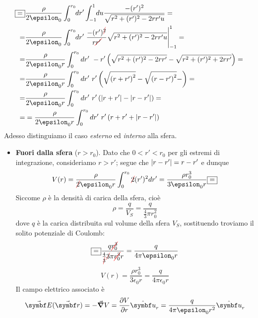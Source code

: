 \begin{examplewt}
	\begin{align*}
		\squarequal&\frac{\rho}{2\epsilon_0}\int^{r_0}_0 \negthickspace dr'\int^1_{-1}\negthickspace du \frac{-(r')^2}{\sqrt{r^2+(r')^2-2rr'u}}=\\
		=&\frac{\rho}{2\epsilon_0}\int^{r_0}_0 \negthickspace dr' \eval{\frac{-(r')^{\Ccancel[red]{2}}}{r\Ccancel[red]{r'}} \sqrt{r^2+(r')^2-2rr'u}}^1_{-1}=\\
		=&\frac{\rho}{2\epsilon_0r}\int^{r_0}_0 dr'\ -r'\left(\sqrt{r^2+(r')^2-2rr'}-\sqrt{r^2+(r')^2+2rr'}\right)=\\
		=&\frac{\rho}{2\epsilon_0r}\int^{r_0}_0 dr'\ r'\left(\sqrt{\left(r+r'\right)^2}-\sqrt{\left(r-r'\right)^2}-\right)=\\
		=&\frac{\rho}{2\epsilon_0r}\int^{r_0}_0 dr'\ r'\left(\abs{r+r'}-\abs{r-r'}\right)=\\
		=&=\frac{\rho}{2\epsilon_0r}\int^{r_0}_0 dr'\ r'\left( r+r' + \abs{r-r'} \right)
	\end{align*}
	Adesso distinguiamo il caso \textit{esterno} ed \textit{interno} alla sfera.
	\begin{itemize}
		\item \textbf{Fuori dalla sfera} ($r>r_0$). Dato che $0<r'<r_0$ per gli estremi di integrazione, consideriamo $r>r'$; segue che $\abs{r-r'}=r-r'$ e dunque
		\begin{equation*}
			V(r)=\frac{\rho}{\Ccancel[red]{2}\epsilon_0 r}\int^{r_0}_0 \Ccancel[red]{2} (r')^2 dr'= \frac{\rho r_0^3}{3\epsilon_0 r}\squarequal
		\end{equation*}
		Siccome $\rho$ è la densità di carica della sfera, cioè
		\begin{equation*}
			\rho=\frac{q}{V_S}=\frac{q}{\frac{4}{3} \pi r_0^2}
		\end{equation*}
		dove $q$ è la carica distribuita sul volume della sfera $V_S$, sostituendo troviamo il solito potenziale di Coulomb:
		\begin{equation*}
			\squarequal\frac{q\Ccancel[red]{r_0^3}}{\frac{4}{\Ccancel[red]{3}}\Ccancel[red]{3}\pi \Ccancel[red]{r_0^3} r}=\frac{q}{4\pi \epsilon_0 r}
		\end{equation*}
		\begin{equation*}
			V(r)=\frac{\rho r_0^3}{3\epsilon_0 r}=\frac{q}{4\pi \epsilon_0 r}
		\end{equation*}
		Il campo elettrico associato è
		\begin{equation*}
			\vba{E}(\vba{r})=-\grad V=\pdv{V}{r}\vbh{u}_r =\frac{q}{4\pi\epsilon_0 r^2}\vbh{u}_r
		\end{equation*}

\end{itemize}
\end{examplewt}
